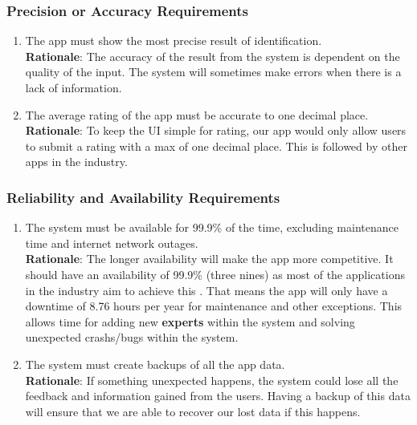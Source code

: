 \subsubsection{Precision or Accuracy Requirements}
\label{ssub:precision_or_accuracy_requirements}
\begin{enumerate}[{PR-PA}1. ]
	\item The app must show the most precise result of identification.
	\\ \textbf{Rationale}: The accuracy of the result from the system is dependent on the quality of the input. The system will sometimes make errors when there is a lack of information.
	\item The average rating of the app must be accurate to one decimal place.
	\\ \textbf{Rationale}: To keep the UI simple for rating, our app would only allow users to submit a rating with a max of one decimal place. This is followed by other apps in the industry. 
\end{enumerate}

\subsubsection{Reliability and Availability Requirements}
\label{ssub:reliability_and_availability_requirements}
\begin{enumerate}[{PR-RA}1. ]
	\item The system must be available for 99.9\% of the time, excluding maintenance time and internet network outages.
	\\ \textbf{Rationale}: The longer availability will make the app more competitive. It should have an availability of 99.9\% (three nines) as most of the applications in the industry aim to achieve this \cite{Britannica2025_WritingSystems}. That means the app will only have a downtime of 8.76 hours per year for maintenance and other exceptions. This allows time for adding new \textbf{experts} within the system and solving unexpected crashs/bugs within the system.
	\item The system must create backups of all the app data.
	\\ \textbf{Rationale}: If something unexpected happens, the system could lose all the feedback and information gained from the users. Having a backup of this data will ensure that we are able to recover our lost data if this happens.
\end{enumerate}


